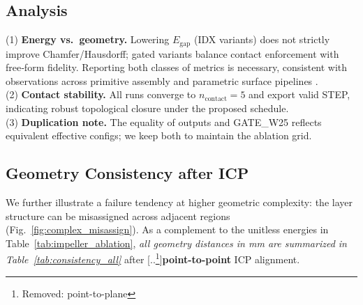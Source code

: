 \documentclass{ieeeaccess}
\providecommand{\DIFaddtex}[1]{{\color{blue}\bfseries #1}} %
\providecommand{\DIFdeltex}[1]{{\color{red}[..\footnote{\color{black}Removed: #1}]}} %
\providecommand{\DIFaddbegin}{} %
\providecommand{\DIFaddend}{} %
\providecommand{\DIFdelbegin}{} %
\providecommand{\DIFdelend}{} %
\providecommand{\DIFadd}[1]{\texorpdfstring{\DIFaddtex{#1}}{#1}} %
\providecommand{\DIFdel}[1]{\texorpdfstring{\DIFdeltex{#1}}{}} %
\begin{document}
\subsection{Analysis}
(1) \textbf{Energy vs.\ geometry.} Lowering $E_{\text{gap}}$ (IDX variants) does not strictly improve Chamfer/Hausdorff; gated variants balance contact enforcement with free‑form fidelity. Reporting both classes of metrics is necessary, consistent with observations across primitive assembly and parametric surface pipelines \cite{b14,b19,b22}.\\
(2) \textbf{Contact stability.} All runs converge to $n_{\text{contact}}{=}5$ and export valid STEP, indicating robust topological closure under the proposed schedule.\\
(3) \textbf{Duplication note.} The equality of outputs and GATE\_W25 reflects equivalent effective configs; we keep both to maintain the ablation grid.

\subsection{Geometry Consistency after ICP}
We further illustrate a failure tendency at higher geometric complexity: the
layer structure can be misassigned across adjacent regions
(Fig.~\ref{fig:complex_misassign}). As a complement to the unitless
energies in Table~\ref{tab:impeller_ablation}, 
\emph{all geometry distances in mm are summarized in
Table~\ref{tab:consistency_all}} after \DIFdelbegin \DIFdel{point-to-plane }\DIFdelend \DIFaddbegin \DIFadd{point-to-point }\DIFaddend ICP alignment.
\end{document}
